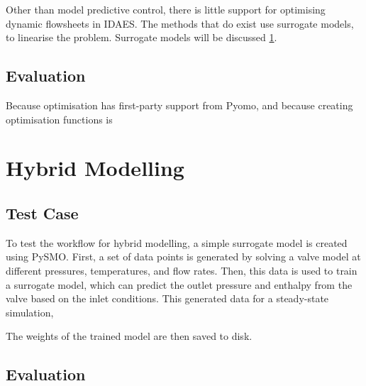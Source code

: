 \documentclass[12pt]{article}
\begin{document}
Other than model predictive control, there is little support for optimising dynamic flowsheets in IDAES. The methods that do exist use surrogate models, to linearise the problem. Surrogate models will be discussed \cref{sec:hybrid}.



\subsection{Evaluation}

Because optimisation has first-party support from Pyomo, and because creating optimisation functions is


\section{Hybrid Modelling} \label{sec:hybrid}
\subsection{Test Case}


To test the workflow for hybrid modelling, a simple surrogate model is created using PySMO. First, a set of data points is generated by solving a valve model at different pressures, temperatures, and flow rates. Then, this data is used to train a surrogate model, which can predict the outlet pressure and enthalpy from the valve based on the inlet conditions. This generated data for a steady-state simulation, 

The weights of the trained model are then saved to disk. 




\subsection{Evaluation}

\end{document}
